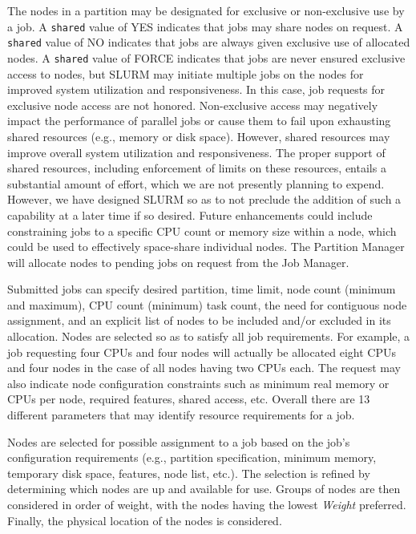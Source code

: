 \documentclass[10pt,onecolumn,times]{llncs}
\begin{document}
{The nodes in a partition may be designated for exclusive or non-exclusive
use by a job.  A {\tt shared} value of YES indicates that jobs may
share nodes on request.  A {\tt shared} value of NO indicates that
jobs are always given exclusive use of allocated nodes.  A {\tt shared}
value of FORCE indicates that jobs are never ensured exclusive
access to nodes, but SLURM may initiate multiple jobs on the nodes
for improved system utilization and responsiveness.  In this case,
job requests for exclusive node access are not honored.  Non-exclusive
access may negatively impact the performance of parallel jobs or cause
them to fail upon exhausting shared resources (e.g., memory or disk
space). However, shared resources may improve overall system utilization
and responsiveness. The proper support of shared resources, including
enforcement of limits on these resources, entails a substantial amount of
effort, which we are not presently planning to expend.  However, we have
designed SLURM so as to not preclude the addition of such a capability
at a later time if so desired.  Future enhancements could include
constraining jobs to a specific CPU count or memory size within a
node, which could be used to effectively space-share individual nodes.
The Partition Manager will allocate nodes to pending jobs on request
from the Job Manager.

Submitted jobs can specify desired partition, time limit, node count
(minimum and maximum), CPU count (minimum) task count, the need for
contiguous node assignment, and an explicit list of nodes to be included
and/or excluded in its allocation.  Nodes are selected so as to satisfy
all job requirements.  For example, a job requesting four CPUs and four
nodes will actually be allocated eight CPUs and four nodes in the case
of all nodes having two CPUs each.  The request may also indicate node
configuration constraints such as minimum real memory or CPUs per node,
required features, shared access, etc.  Overall there are 13 different
parameters that may identify resource requirements for a job.

Nodes are selected for possible assignment to a job based on the
job's configuration requirements (e.g., partition specification, minimum
memory, temporary disk space, features, node list, etc.).  The selection
is refined by determining which nodes are up and available for use.
Groups of nodes are then considered in order of weight, with the nodes
having the lowest {\em Weight} preferred.  Finally, the physical location
of the nodes is considered.

}
\end{document}
